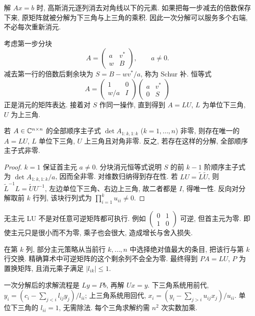 \label{ch:direct}
解 $Ax=b$ 时, 高斯消元逐列消去对角线以下的元素. 如果把每一步减去的倍数保存下来, 原矩阵就被分解为下三角与上三角的乘积. 因此一次分解可以服务多个右端, 不必每次重新消元.

考虑第一步分块
\[
A=\begin{pmatrix}a&v^*\\w&B\end{pmatrix},\qquad a\ne0.
\]
减去第一行的倍数后剩余块为 $S=B-wv^*/a$, 称为 Schur 补. 恒等式
\[
A=\begin{pmatrix}1&0\\w/a&I\end{pmatrix}
\begin{pmatrix}a&v^*\\0&S\end{pmatrix}
\]
正是消元的矩阵表达. 接着对 $S$ 作同一操作, 直到得到 $A=LU$, $L$ 为单位下三角, $U$ 为上三角.

\begin{theorem}\label{thm:lu}
若 $A\in\mathbb C^{n\times n}$ 的全部顺序主子式 $\det A_{1:k,1:k}$ ($k=1,\ldots,n$) 非零, 则存在唯一的 $A=LU$, $L$ 单位下三角, $U$ 上三角且对角非零. 反之, 若存在这样的分解, 全部顺序主子式非零.
\end{theorem}
\begin{proof}
$k=1$ 保证首主元 $a\ne0$. 分块消元恒等式说明 $S$ 的前 $k-1$ 阶顺序主子式为 $\det A_{1:k,1:k}/a$, 因而全非零. 对维数归纳得到存在性. 若 $LU=\widetilde L\widetilde U$, 则 $\widetilde L^{-1}L=\widetilde U U^{-1}$, 左边单位下三角、右边上三角, 故二者都是 $I$, 得唯一性. 反向对分解取前 $k$ 行列, 该块行列式为 $\prod_{i=1}^k u_{ii}\ne0$.
\end{proof}
无主元 LU 不是对任意可逆矩阵都可执行. 例如 $\begin{pmatrix}0&1\\1&0\end{pmatrix}$ 可逆, 但首主元为零. 即使主元只是很小而不为零, 乘子也会很大, 造成增长与舍入损失.

在第 $k$ 列, 部分主元策略从当前行 $k,\ldots,n$ 中选择绝对值最大的条目, 把该行与第 $k$ 行交换. 精确算术中可逆矩阵的这个剩余列不会全为零. 最终得到 $PA=LU$, $P$ 为置换矩阵, 且消元乘子满足 $|l_{ik}|\le1$.

一次分解后的求解流程是 $Ly=Pb$, 再解 $Ux=y$. 下三角系统用前代,
$y_i=(c_i-\sum_{j<i}l_{ij}y_j)/l_{ii}$;
上三角系统用回代,
$x_i=(y_i-\sum_{j>i}u_{ij}x_j)/u_{ii}$.
单位下三角的 $l_{ii}=1$, 无需除法. 每个三角求解约需 $n^2$ 次实数加乘.

